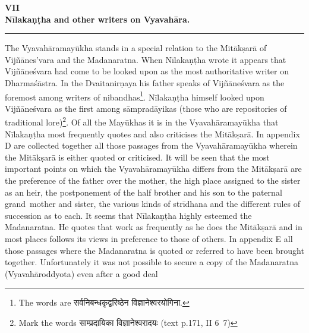 \documentclass[11pt, openany]{book}
\begin{document}
\begin{center}
\textbf{\large VII}\\

\vspace{1mm}
\textbf{\large Nīlakaṇṭha and other writers on Vyavahāra.}\\

\rule{0.2\linewidth}{0.5pt}
\end{center}

The Vyavahāramayūkha stands in a special relation to the Mitākṣarā of Vijñānes'vara and the Madanaratna. When Nīlakaṇṭha wrote it appears that Vijñāneśvara had come to be looked upon as the most authoritative writer on Dharmaśāstra. In the Dvaitanirṇaya his father speaks of Vijñāneśvara as the foremost among writers of {\qt nibandhas}\renewcommand{\thefootnote}{1}\footnote{The words are {\qt सर्वनिबन्धकृद्वरिष्ठेन विज्ञानेश्वरयोगिना}.}. Nīlakaṇṭha himself looked upon Vijñāneśvara as the first among {\qt sāmpradāyikas} (those who are repositories of traditional lore)\renewcommand{\thefootnote}{2}\footnote{Mark the words {\qt साम्प्रदायिका विज्ञानेश्वरादयः} (text p.171, II 6\textendash\ 7)}. Of all the Mayūkhas it is in the Vyavahāramayūkha that Nīlakaṇṭha most frequently quotes and also criticises the Mitākṣarā. In appendix D are collected together all those passages from the Vyavahāramayūkha wherein the Mitākṣarā is either quoted or criticised. It will be seen that the most important points on which the Vyavahāramayūkha differs from the Mitākṣarā are the preference of the father over the mother, the high place assigned to the sister as an heir, the postponement of the half brother and his son to the paternal grand\textendash\ mother and sister, the various kinds of strīdhana and the different rules of succession as to each. It seems that Nīlakaṇṭha highly esteemed the Madanaratna. He quotes that work as frequently as he does the Mitākṣarā and in most places follows its views in preference to those of others. In appendix E all those passages where the Madanaratna is quoted or referred to have been brought together. Unfortunately it was not possible to secure a copy of the Madanaratna (Vyavahāroddyota) even after a good deal

\fancyhead[RE,LO]{\thepage}
\cfoot{}
\newpage
\renewcommand{\thepage}{\Roman{page}}
\setcounter{page}{39}

\end{document}
